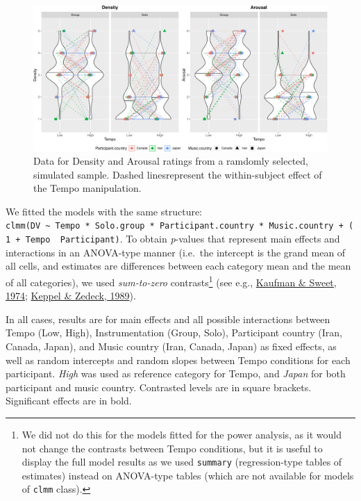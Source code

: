 \documentclass[
  bookmarksnumbered]{article}
\begin{document}
\begin{figure}
\centering
\includegraphics{Power_analysis_files/figure-latex/unnamed-chunk-17-1.pdf}
\caption{\label{fig:unnamed-chunk-17}Data for Density and Arousal ratings from a ramdomly selected, simulated sample. Dashed linesrepresent the within-subject effect of the Tempo manipulation.}
\end{figure}

We fitted the models with the same structure: \texttt{clmm(DV\ \textasciitilde{}\ Tempo\ *\ Solo.group\ *\ Participant.country\ *\ Music.country\ +\ (1\ +\ Tempo\ \textbar{}\ Participant)}. To obtain \emph{p}-values that represent main effects and interactions in an ANOVA-type manner (i.e.~the intercept is the grand mean of all cells, and estimates are differences between each category mean and the mean of all categories), we used \emph{sum-to-zero} contrasts\footnote{We did not do this for the models fitted for the power analysis, as it would not change the contrasts between Tempo conditions, but it is useful to display the full model results as we used \texttt{summary} (regression-type tables of estimates) instead on ANOVA-type tables (which are not available for models of \texttt{clmm} class).} (see e.g., \protect\hyperlink{ref-kaufmanContrastCodingLeast1974}{Kaufman \& Sweet, 1974}; \protect\hyperlink{ref-keppelDataAnalysisResearch1989}{Keppel \& Zedeck, 1989}).

In all cases, results are for main effects and all possible interactions between Tempo (Low, High), Instrumentation (Group, Solo), Participant country (Iran, Canada, Japan), and Music country (Iran, Canada, Japan) as fixed effects, as well as random intercepts and random slopes between Tempo conditions for each participant. \emph{High} was used as reference category for Tempo, and \emph{Japan} for both participant and music country. Contrasted levels are in square brackets. Significant effects are in bold.
\end{document}
